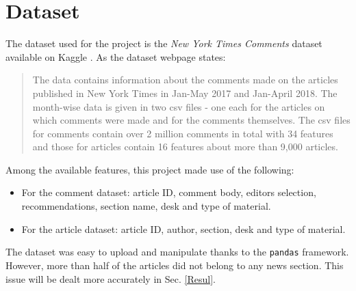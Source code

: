 \section{Dataset}

The dataset used for the project is the \textit{New York Times Comments} dataset available on Kaggle \cite{Dataset}. As the dataset webpage states:

\begin{quote}
The data contains information about the comments made on the articles published in New York Times in Jan-May 2017 and Jan-April 2018. The month-wise data is given in two csv files - one each for the articles on which comments were made and for the comments themselves. The csv files for comments contain over 2 million comments in total with 34 features and those for articles contain 16 features about more than 9,000 articles.
\end{quote}

Among the available features, this project made use of the following:
\begin{itemize}
\item For the comment dataset: article ID, comment body, editors selection, recommendations, section name, desk and type of material.
\item For the article dataset: article ID, author, section, desk and type of material.
\end{itemize}

The dataset was easy to upload and manipulate thanks to the {\tt pandas} framework. However, more than half of the articles did not belong to any news section. This issue will be dealt more accurately in Sec. \ref{Resul}. 